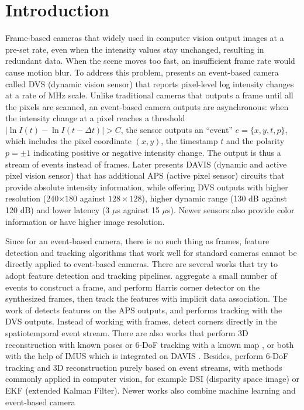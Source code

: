 \chapter{Introduction}
\label{sec:introduction}

Frame-based cameras that widely used in computer vision output images
at a pre-set rate, even when the intensity values stay unchanged,
resulting in redundant data. When the scene moves too fast, an
insufficient frame rate would cause motion blur. To address this
problem, \citet{lichtsteiner2008128} presents an event-based camera
called DVS (dynamic vision sensor) that reports pixel-level log
intensity changes at a rate of \unit{MHz} scale. Unlike traditional
cameras that outputs a frame until all the pixels are scanned, an
event-based camera outputs are asynchronous: when the intensity change
at a pixel reaches a threshold
$\mid\ln{I(t)}-\ln{I(t-\Delta t)}\mid>C$, the sensor outputs an
``event'' $e=\{x,y,t,p\}$, which includes the pixel coordinate
$(x, y)$, the timestamp $t$ and the polarity $p=\pm1$ indicating
positive or negative intensity change. The output is thus a stream of
events instead of frames. Later \citet{brandli2014240} presents DAVIS
(dynamic and active pixel vision sensor) that has additional APS
(active pixel sensor) circuits that provide absolute intensity
information, while offering DVS outputs with higher resolution
(240$\times180$ against $128\times128$), higher dynamic range (130 dB
against 120 dB) and lower latency (3 $\mu$s against 15 $\mu$s). Newer
sensors also provide color
information\citep{li2015design,moeys2018sensitive} or have higher
image resolution\citep{son20174}.

Since for an event-based camera, there is no such thing as frames,
feature detection and tracking algorithms that work well for standard
cameras cannot be directly applied to event-based cameras. There are
several works that try to adopt feature detection and tracking
pipelines. \citet{zhu2017event} aggregate a small number of events to
construct a frame, and perform Harris corner detector
\citep{harris1988combined} on the synthesized frames, then track the
features with implicit data association. The work of
\citet{tedaldi2016feature} detects features on the APS outputs, and
performs tracking with the DVS outputs. Instead of working with
frames, \citet{mueggler2017fast} detect corners directly in the
spatiotemporal event stream. There are also works that perform 3D
reconstruction with known poses \citep{rebecq2016emvs} or 6-DoF
tracking with a known map \citep{gallego2017event}, or both with the
help of IMUS which is integrated on DAVIS
\citep{rebecq2017real}. Besides, \citep{kim2016real,rebecq2017evo}
perform 6-DoF tracking and 3D reconstruction purely based on event
streams, with methods commonly applied in computer vision, for example
DSI (disparity space image) or EKF (extended Kalman Filter). Newer
works also combine machine learning and event-based camera
\citep{orchard2015hfirst,maqueda2018event,zhu2018ev}

